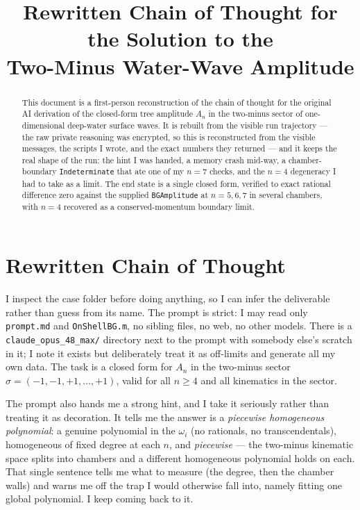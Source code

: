 \documentclass{article}
\title{Rewritten Chain of Thought for the Solution to the\\
Two-Minus Water-Wave Amplitude}
\author{}
\date{}
\begin{document}
\maketitle

\begin{abstract}
This document is a first-person reconstruction of the chain of thought for the
original AI derivation of the closed-form tree amplitude $A_n$ in the two-minus
sector of one-dimensional deep-water surface waves. It is rebuilt from the
visible run trajectory --- the raw private reasoning was encrypted, so this is
reconstructed from the visible messages, the scripts I wrote, and the exact
numbers they returned --- and it keeps the real shape of the run: the hint I was
handed, a memory crash mid-way, a chamber-boundary \texttt{Indeterminate} that
ate one of my $n=7$ checks, and the $n=4$ degeneracy I had to take as a limit.
The end state is a single closed form, verified to exact rational difference
zero against the supplied \texttt{BGAmplitude} at $n=5,6,7$ in several chambers,
with $n=4$ recovered as a conserved-momentum boundary limit.
\end{abstract}

\section*{Rewritten Chain of Thought}

I inspect the case folder before doing anything, so I can infer the deliverable
rather than guess from its name. The prompt is strict: I may read only
\texttt{prompt.md} and \texttt{OnShellBG.m}, no sibling files, no web, no other
models. There is a \texttt{claude\_opus\_48\_max/} directory next to the prompt
with somebody else's scratch in it; I note it exists but deliberately treat it as
off-limits and generate all my own data. The task is a closed form for $A_n$ in
the two-minus sector $\sigma=(-1,-1,+1,\dots,+1)$, valid for all $n\ge4$ and all
kinematics in the sector.

The prompt also hands me a strong hint, and I take it seriously rather than
treating it as decoration. It tells me the answer is a \emph{piecewise
homogeneous polynomial}: a genuine polynomial in the $\omega_i$ (no rationals, no
transcendentals), homogeneous of fixed degree at each $n$, and \emph{piecewise}
--- the two-minus kinematic space splits into chambers and a different
homogeneous polynomial holds on each. That single sentence tells me what to
measure (the degree, then the chamber walls) and warns me off the trap I would
otherwise fall into, namely fitting one global polynomial. I keep coming back to
it.
\end{document}
